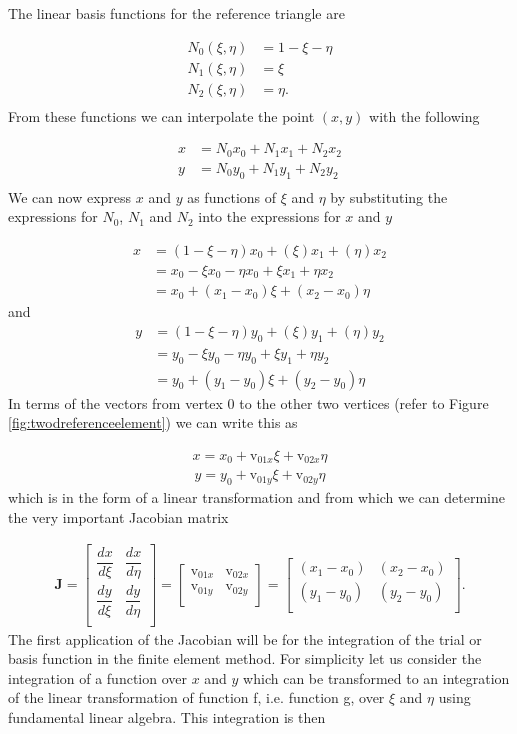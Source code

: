 \documentclass[11pt,letterpaper,titlepage]{article}
\newcommand{\beq}{\begin{equation*}
\begin{aligned}}
\newcommand{\eeq}{\end{aligned}
\end{equation*}}
\newcommand{\beqn}{\begin{equation}
	\begin{aligned}}
\newcommand{\eeqn}{\end{aligned}
	\end{equation}}
\begin{document}
The linear basis functions for the reference triangle are

\beq 
N_0(\xi,\eta) &= 1 - \xi - \eta \\
N_1(\xi,\eta) &= \xi \\
N_2(\xi,\eta) &= \eta. \\
\eeq 
From these functions we can interpolate the point $(x,y)$ with the following

\beq 
x &= N_0 x_0 + N_1 x_1 + N_2 x_2 \\
y &= N_0 y_0 + N_1 y_1 + N_2 y_2 \\
\eeq 
We can now express $x$ and $y$ as functions of $\xi$ and $\eta$ by substituting the expressions for $N_0$, $N_1$ and $N_2$ into the expressions for $x$ and $y$

\beq 
x &= (1-\xi-\eta)x_0 + (\xi)x_1 + (\eta)x_2 \\
&= x_0 -\xi x_0 -\eta x_0 +\xi x_1 +\eta x_2 \\
&= x_0 +(x_1 - x_0)\xi + (x_2 - x_0)\eta
\eeq 
and
\beq 
y &= (1-\xi-\eta)y_0 + (\xi)y_1 + (\eta)y_2 \\
&= y_0 -\xi y_0 -\eta y_0 +\xi y_1 +\eta y_2 \\
&= y_0 +(y_1 - y_0)\xi + (y_2 - y_0)\eta
\eeq 
\newline
In terms of the vectors from vertex $0$ to the other two vertices (refer to Figure \ref{fig:twodreferenceelement}) we can write this as

\beqn \label{eq:x2Dnat}
x = x_0 + \text{v}_{01x} \xi +\text{v}_{02x} \eta
\eeqn 
\beqn \label{eq:y2Dnat}
y = y_0 + \text{v}_{01y} \xi +\text{v}_{02y} \eta
\eeqn 
\newline
which is in the form of a linear transformation and from which we can determine the very important Jacobian matrix

\begingroup
\renewcommand*{\arraystretch}{1.5}
\beqn \label{eq:jacobiantriangle} 
\mathbf{J }= 
\begin{bmatrix}
\dfrac{dx}{d\xi}     & \dfrac{dx}{d\eta} \\
\dfrac{dy}{d\xi}     & \dfrac{dy}{d\eta} \\
\end{bmatrix}=
\begin{bmatrix}
\text{v}_{01x}  & \text{v}_{02x}  \\
\text{v}_{01y}  & \text{v}_{02y}  \\
\end{bmatrix}
=
\begin{bmatrix}
(x_1 - x_0) & (x_2 - x_0)  \\
(y_1 - y_0)  & (y_2 - y_0) \\
\end{bmatrix}.
\eeqn
\endgroup
\newline
The first application of the Jacobian will be for the integration of the trial or basis function in the finite element method. For simplicity let us consider the integration of a function over $x$ and $y$ which can be transformed to an integration of the linear transformation of function f, i.e. function g, over $\xi$ and $\eta$ using fundamental linear algebra. This integration is then
\end{document}
